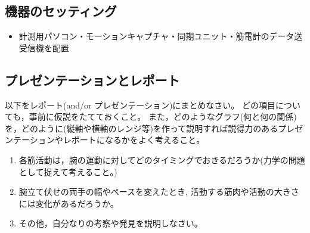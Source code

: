 \documentclass{jsarticle}
\begin{document}
\subsection{機器のセッティング}
\begin{itemize}
\item 計測用パソコン・モーションキャプチャ・同期ユニット・筋電計のデータ送受信機を配置
\end{itemize}

\subsection{プレゼンテーションとレポート}

以下をレポート(and/or プレゼンテーション)にまとめなさい。
どの項目についても，事前に仮説をたてておくこと。
また，どのようなグラフ(何と何の関係)を，どのように(縦軸や横軸のレンジ等)を作って説明すれば説得力のあるプレゼンテーションやレポートになるかをよく考えること。


\begin{enumerate}
  \item 各筋活動は，腕の運動に対してどのタイミングでおきるだろうか(力学の問題として捉えて考えること。)
  \item 腕立て伏せの両手の幅やペースを変えたとき, 活動する筋肉や活動の大きさには変化があるだろうか。
  \item その他，自分なりの考察や発見を説明しなさい。
\end{enumerate}
\end{document}
